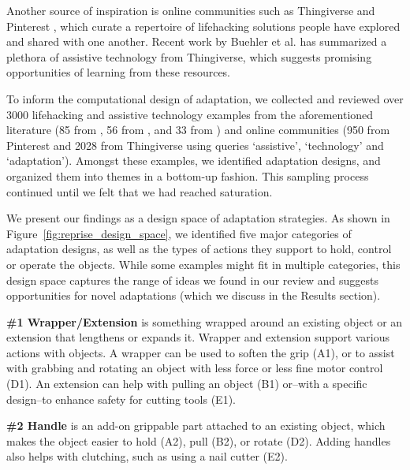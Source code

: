 Another source of inspiration is online communities such as Thingiverse \cite{thingiverse} and Pinterest \cite{pinterest}, which curate a repertoire of lifehacking solutions people have explored and shared with one another. Recent work by Buehler et al. \cite{buehler2015sharing} has summarized a plethora of assistive technology from Thingiverse, which suggests promising opportunities of learning from these resources.

To inform the computational design of adaptation, we collected and reviewed over 3000 lifehacking and assistive technology examples from the aforementioned literature (85 from \cite{plaxen2005adapt}, 56 from \cite{willkolmm2013assistive}, and 33 from \cite{robitaille2010illustrated}) and online communities (950 from Pinterest  and 2028 from Thingiverse using queries `assistive', `technology' and `adaptation'). Amongst these examples, we identified adaptation designs, and  organized them into themes in a bottom-up fashion. This sampling process continued until we felt that we had reached saturation.


We present our findings as a design space of adaptation strategies. As shown in Figure~\ref{fig:reprise_design_space}, we identified five major categories of adaptation designs, as well as the types of actions they support to hold, control or operate the objects. While some examples might fit in multiple categories, this design space captures the range of ideas we found in our review and suggests opportunities for novel adaptations (which we discuss in the Results section).

\textbf{\#1 Wrapper/Extension} is something wrapped around an existing object or an extension that lengthens or expands it. Wrapper and extension support various actions with objects. A wrapper can be used to soften the grip (A1), or to assist with grabbing and rotating an object  with less force or less fine motor control (D1). An extension can help with pulling an object (B1) or--with a specific design--to enhance safety for cutting tools (E1).

\textbf{\#2 Handle} is an add-on grippable part attached to an existing object, which makes the object easier to hold (A2), pull (B2), or rotate (D2). Adding handles also helps with clutching, such as using a nail cutter (E2).

